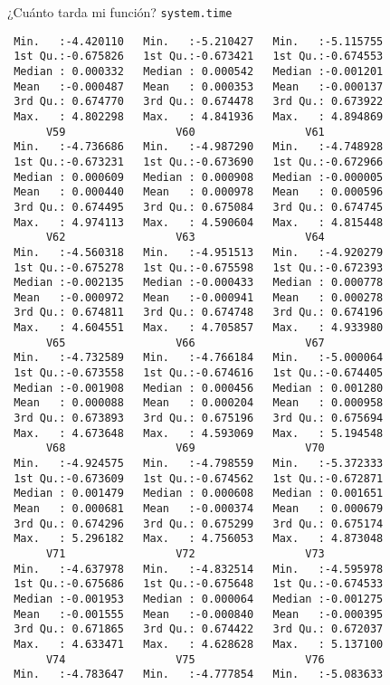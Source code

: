 \documentclass[xcolor={usenames,svgnames,dvipsnames}]{beamer}
\begin{document}
\begin{frame}[label={sec:org4ea8038},fragile]{¿Cuánto tarda mi función? \texttt{system.time}}
\begin{verbatim}
 Min.   :-4.420110   Min.   :-5.210427   Min.   :-5.115755  
 1st Qu.:-0.675826   1st Qu.:-0.673421   1st Qu.:-0.674553  
 Median : 0.000332   Median : 0.000542   Median :-0.001201  
 Mean   :-0.000487   Mean   : 0.000353   Mean   :-0.000137  
 3rd Qu.: 0.674770   3rd Qu.: 0.674478   3rd Qu.: 0.673922  
 Max.   : 4.802298   Max.   : 4.841936   Max.   : 4.894869  
      V59                 V60                 V61           
 Min.   :-4.736686   Min.   :-4.987290   Min.   :-4.748928  
 1st Qu.:-0.673231   1st Qu.:-0.673690   1st Qu.:-0.672966  
 Median : 0.000609   Median : 0.000908   Median :-0.000005  
 Mean   : 0.000440   Mean   : 0.000978   Mean   : 0.000596  
 3rd Qu.: 0.674495   3rd Qu.: 0.675084   3rd Qu.: 0.674745  
 Max.   : 4.974113   Max.   : 4.590604   Max.   : 4.815448  
      V62                 V63                 V64           
 Min.   :-4.560318   Min.   :-4.951513   Min.   :-4.920279  
 1st Qu.:-0.675278   1st Qu.:-0.675598   1st Qu.:-0.672393  
 Median :-0.002135   Median :-0.000433   Median : 0.000778  
 Mean   :-0.000972   Mean   :-0.000941   Mean   : 0.000278  
 3rd Qu.: 0.674811   3rd Qu.: 0.674748   3rd Qu.: 0.674196  
 Max.   : 4.604551   Max.   : 4.705857   Max.   : 4.933980  
      V65                 V66                 V67           
 Min.   :-4.732589   Min.   :-4.766184   Min.   :-5.000064  
 1st Qu.:-0.673558   1st Qu.:-0.674616   1st Qu.:-0.674405  
 Median :-0.001908   Median : 0.000456   Median : 0.001280  
 Mean   : 0.000088   Mean   : 0.000204   Mean   : 0.000958  
 3rd Qu.: 0.673893   3rd Qu.: 0.675196   3rd Qu.: 0.675694  
 Max.   : 4.673648   Max.   : 4.593069   Max.   : 5.194548  
      V68                 V69                 V70           
 Min.   :-4.924575   Min.   :-4.798559   Min.   :-5.372333  
 1st Qu.:-0.673609   1st Qu.:-0.674562   1st Qu.:-0.672871  
 Median : 0.001479   Median : 0.000608   Median : 0.001651  
 Mean   : 0.000681   Mean   :-0.000374   Mean   : 0.000679  
 3rd Qu.: 0.674296   3rd Qu.: 0.675299   3rd Qu.: 0.675174  
 Max.   : 5.296182   Max.   : 4.756053   Max.   : 4.873048  
      V71                 V72                 V73           
 Min.   :-4.637978   Min.   :-4.832514   Min.   :-4.595978  
 1st Qu.:-0.675686   1st Qu.:-0.675648   1st Qu.:-0.674533  
 Median :-0.001953   Median : 0.000064   Median :-0.001275  
 Mean   :-0.001555   Mean   :-0.000840   Mean   :-0.000395  
 3rd Qu.: 0.671865   3rd Qu.: 0.674422   3rd Qu.: 0.672037  
 Max.   : 4.633471   Max.   : 4.628628   Max.   : 5.137100  
      V74                 V75                 V76           
 Min.   :-4.783647   Min.   :-4.777854   Min.   :-5.083633  

\end{verbatim}
\end{frame}
\end{document}
